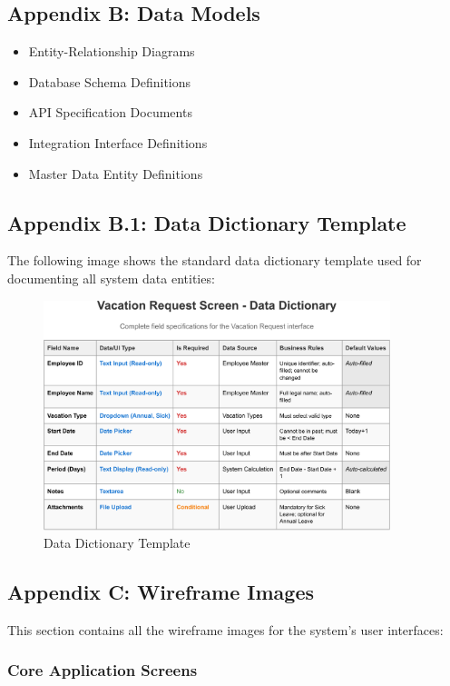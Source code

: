 \documentclass[12pt,a4paper]{article}
\begin{document}
\subsection{Appendix B: Data Models}
\begin{itemize}
    \item Entity-Relationship Diagrams
    \item Database Schema Definitions
    \item API Specification Documents
    \item Integration Interface Definitions
    \item Master Data Entity Definitions
\end{itemize}

\subsection{Appendix B.1: Data Dictionary Template}
The following image shows the standard data dictionary template used for documenting all system data entities:

\begin{figure}[H]
\centering
\includegraphics[width=0.9\textwidth]{Data-Dictionary/Data-Dictionary-Template/Data-Dictionary-Template-1.png}
\caption{Data Dictionary Template}
\label{fig:data-dictionary-template}
\end{figure}

\subsection{Appendix C: Wireframe Images}
This section contains all the wireframe images for the system's user interfaces:

\subsubsection{Core Application Screens}
\end{document}
